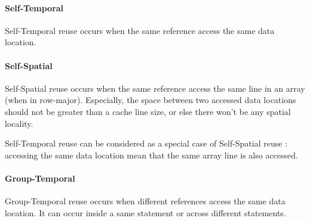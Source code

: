 \documentclass[paper=a4, fontsize=11pt]{scrartcl}
\numberwithin{equation}{section}        %
\numberwithin{figure}{section}          %
\numberwithin{table}{section}               %
\begin{document}

            \paragraph{Self-Temporal}
                Self-Temporal reuse occurs when the same reference access the same
                data location.
                

            \paragraph{Self-Spatial}
                Self-Spatial reuse occurs when the same reference access the same
                line in an array (when in row-major). Especially, the space between
                two accessed data locations should not be greater than a cache line size,
                or else there won't be any spatial locality.


                Self-Temporal reuse can be considered as a special case of
                Self-Spatial reuse : accessing the same data location mean that
                the same array line is also accessed.
            \paragraph{Group-Temporal}
                Group-Temporal reuse occurs when different references access the same
                data location. It can occur inside a same statement or across different
                statements.

\end{document}
